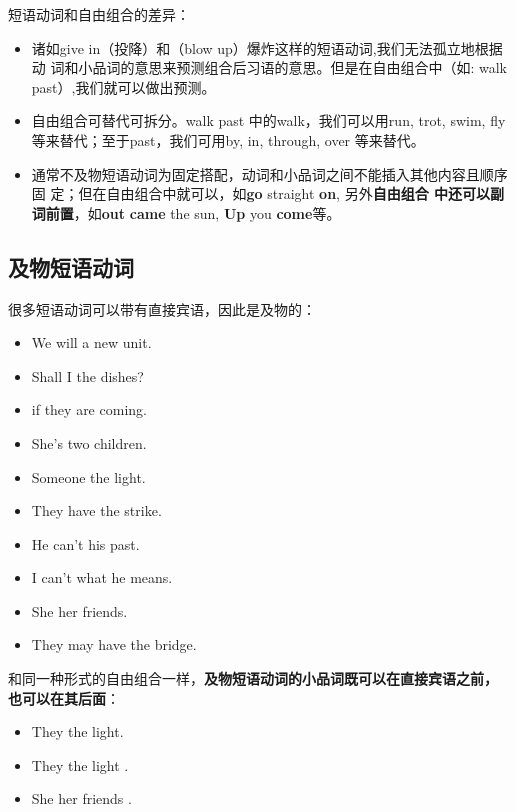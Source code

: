 短语动词和自由组合的差异：
\begin{itemize}
\item 诸如give in（投降）和（blow up）爆炸这样的短语动词,我们无法孤立地根据动
  词和小品词的意思来预测组合后习语的意思。但是在自由组合中（如: walk
  past）,我们就可以做出预测。

\item 自由组合可替代可拆分。walk past 中的walk，我们可以用run, trot, swim,
  fly 等来替代；至于past，我们可用by, in, through, over 等来替代。


\item 通常不及物短语动词为固定搭配，动词和小品词之间不能插入其他内容且顺序固
  定；但在自由组合中就可以，如\textbf{go} straight \textbf{on}, 另外\textbf{自由组合
  中还可以副词前置}，如\textbf{out} \textbf{came} the sun, \textbf{Up} you
  \textbf{come}等。

\end{itemize}

\subsection{及物短语动词}

很多短语动词可以带有直接宾语，因此是及物的：
\begin{itemize}
\item We will  a new unit.
\item Shall I  the dishes?
\item {} if they are coming.
\item She's  two children.
\item Someone  the light.
\item They have  the strike.
\item He can't  his past.
\item I can't  what he means.
\item She  her friends.
\item They may have  the bridge.
\end{itemize}

和同一种形式的自由组合一样，\textbf{及物短语动词的小品词既可以在直接宾语之前，
  也可以在其后面}：
\begin{itemize}
\item They  the light.
\item They  the light .
\item She  her friends .
\end{itemize}


